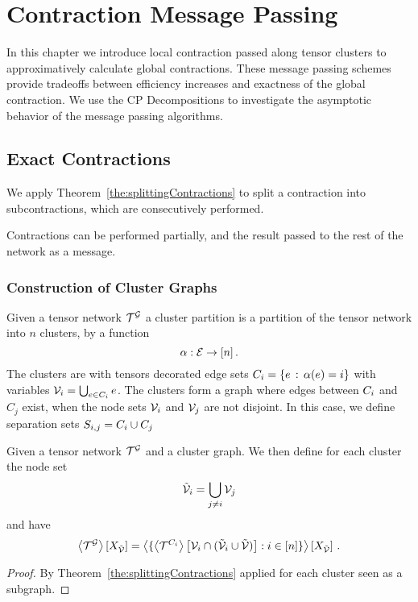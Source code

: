 \section{Contraction Message Passing}\label{cha:localContractions}

In this chapter we introduce local contraction passed along tensor clusters to approximatively calculate global contractions.
These message passing schemes provide tradeoffs between efficiency increases and exactness of the global contraction.
We use the CP Decompositions to investigate the asymptotic behavior of the message passing algorithms.



\subsection{Exact Contractions}


We apply Theorem~\ref{the:splittingContractions} to split a contraction into subcontractions, which are consecutively performed.

Contractions can be performed partially, and the result passed to the rest of the network as a message.

\subsubsection{Construction of Cluster Graphs}

\begin{definition}
	Given a tensor network $\mathcal{T}^{\mathcal{G}}$ a cluster partition is a partition of the tensor network into $n$ clusters, by a function
		\[ \alpha : \mathcal{E} \rightarrow [n] \, . \]
	The clusters are with tensors decorated edge sets $C_{i} = \{e \, : \, \alpha(e) = i\}$ with variables $\mathcal{V}_i = \bigcup_{e \in C_{i}} e$.
	The clusters form a graph where edges between $C_{i}$ and $C_j$ exist, when the node sets $\mathcal{V}_i$ and $\mathcal{V}_j$ are not disjoint.
	In this case, we define separation sets $S_{i,j}=C_{i}\cup C_j$
\end{definition}

\begin{theorem}
	Given a tensor network $\mathcal{T}^{\mathcal{G}}$ and a cluster graph.
	We then define for each cluster the node set
		\[ \tilde{\mathcal{V}}_i = \bigcup_{j\neq i} \mathcal{V}_j \]
	and have
		\[ \left\langle \mathcal{T}^{\mathcal{G}}\right\rangle \left[ X_{\tilde{\mathcal{V}}} \right] = 
		\left\langle 
			\{ \left\langle  \mathcal{T}^{C_{i}} \right\rangle \left[ \mathcal{V}_i \cap (\tilde{\mathcal{V}}_i\cup\tilde{\mathcal{V}}) \right]  : i \in [n]\}
		\right\rangle \left[ X_{\tilde{\mathcal{V}}} \right]  \, . \]
\end{theorem}
\begin{proof}
	By Theorem~\ref{the:splittingContractions} applied for each cluster seen as a subgraph.
\end{proof}



